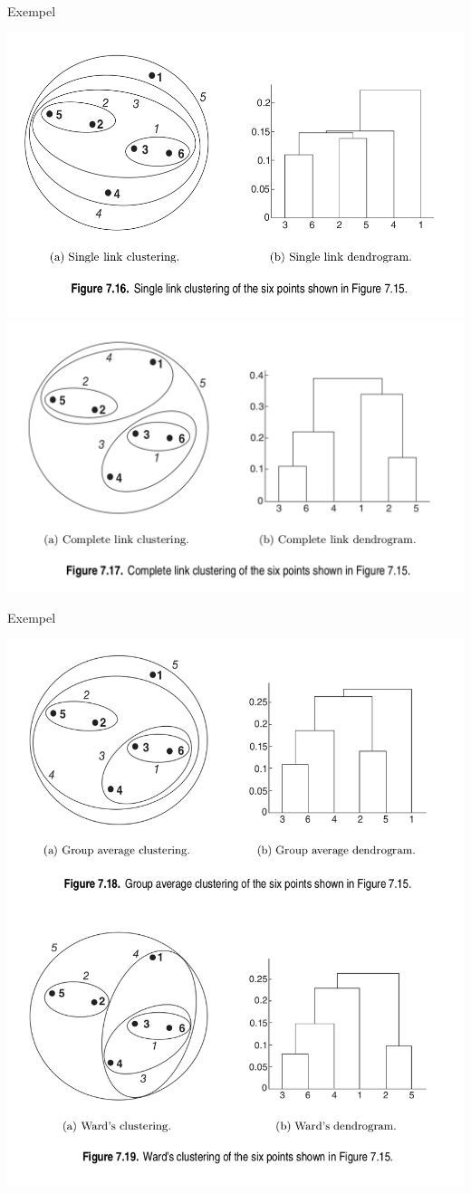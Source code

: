 \documentclass[10pt,english]{beamer}
\begin{document}
\begin{frame}{Exempel}

    \includegraphics[width=.495\textwidth]{figs/Single link clustering.png} \includegraphics[width=.495\textwidth]{figs/Complete link clustering.png}
    
\end{frame}

\begin{frame}{Exempel}

    \includegraphics[height=\textheight]{figs/grouP_ward_clustering.png}
    
\end{frame}
\end{document}
